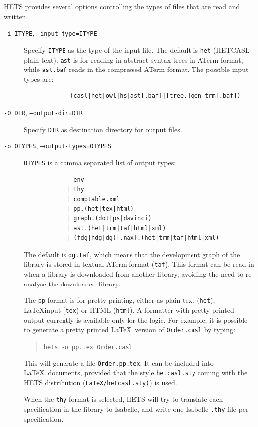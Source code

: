 \documentclass{article}
\newcommand{\normalTEXTSC}[2]{{#1\scriptsize#2}}
\newcommand     {\Hets}{\normalTEXTSC{H}{ETS}\xspace}
\newcommand{\HetCASL}{\normalTEXTSC{H}{ET}\normalTEXTSC{C}{ASL}\xspace}
\begin{document}
\Hets provides several options controlling the types of files
that are read and written.
\begin{description}
\item[\texttt{-i ITYPE}, \texttt{--input-type=ITYPE}] Specify
\texttt{ITYPE} as the type of the input file.  The default is
\texttt{het} (\HetCASL plain text). \texttt{ast} is for reading
in abstract syntax trees in ATerm format, while \texttt{ast.baf}
reads in the compressed ATerm format.
The possible input types are:
\begin{verbatim}
             (casl|het|owl|hs|ast[.baf]|[tree.]gen_trm[.baf])
\end{verbatim}

\item[\texttt{-O DIR}, \texttt{--output-dir=DIR}] 
Specify \texttt{DIR} as  destination directory for output files.

\item[\texttt{-o OTYPES}, \texttt{--output-types=OTYPES}]  
\texttt{OTYPES} is a comma separated list of output types:
\begin{verbatim}
              env
            | thy
            | comptable.xml
            | pp.(het|tex|html)
            | graph.(dot|ps|davinci)
            | ast.(het|trm|taf|html|xml)
            | (fdg|hdg|dg)[.nax].(het|trm|taf|html|xml)
\end{verbatim}
The default is \texttt{dg.taf}, which means that the development
graph of the library is stored in textual ATerm format (\texttt{taf}).
This format can be read in when a library is downloaded from
another library, avoiding the need to re-analyse the downloaded library.

The \texttt{pp} format is for pretty printing, either as plain text
(\texttt{het}), \LaTeX input (\texttt{tex}) or HTML (\texttt{html}).
A formatter with pretty-printed output currently is available only for
the \CASL logic. For example, it is possible to generate a pretty
printed \LaTeX\ version of \texttt{Order.casl} by typing:

\begin{quote}
\texttt{hets -o pp.tex Order.casl}
\end{quote}

This will generate a file \texttt{Order.pp.tex}. It can be included
into \LaTeX\ documents, provided that the style \texttt{hetcasl.sty}
coming with the \Hets distribution (\texttt{LaTeX/hetcasl.sty)}) is used.

When the \texttt{thy} format is selected, \Hets will try to translate
each specification in the library to Isabelle, and write one Isabelle
\texttt{.thy} file per specification.


\end{description}
\end{document}

